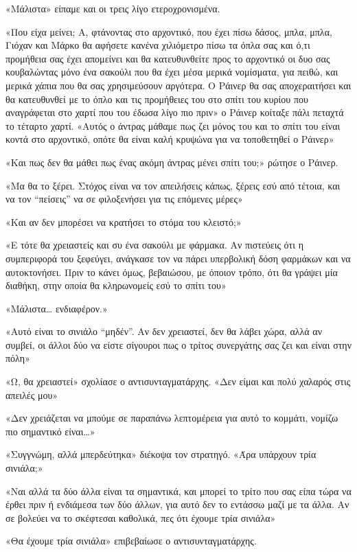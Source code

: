 \documentclass[12pt,twoside, openany]{book}
\begin{document}
«Μάλιστα» είπαμε και οι τρεις λίγο ετεροχρονισμένα.

«Που είχα μείνει; Α, φτάνοντας στο αρχοντικό, που έχει πίσω δάσος, μπλα, μπλα, Γιόχαν και Μάρκο θα αφήσετε κανένα χιλιόμετρο πίσω τα όπλα σας και ό,τι προμήθεια σας έχει απομείνει και θα κατευθυνθείτε προς το αρχοντικό οι δυο σας κουβαλώντας μόνο ένα σακούλι που θα έχει μέσα μερικά νομίσματα, για πειθώ, και μερικά χάπια που θα σας χρησιμεύσουν αργότερα. Ο Ράινερ θα σας αποχεραιτήσει και θα κατευθυνθεί με το όπλο και τις προμήθειες του στο σπίτι του κυρίου που αναγράφεται στο χαρτί που του έδωσα λίγο πιο πριν» ο Ράινερ κοίταξε πάλι πεταχτά το τέταρτο χαρτί. «Αυτός ο άντρας μάθαμε πως ζει μόνος του και το σπίτι του είναι κοντά στο αρχοντικό, οπότε θα είναι καλή κρυψώνα για να τοποθετηθεί ο Ράινερ»

«Και πως δεν θα μάθει πως ένας ακόμη άντρας μένει σπίτι του;» ρώτησε ο Ράινερ.

«Μα θα το ξέρει. Στόχος είναι να τον απειλήσεις κάπως, ξέρεις εσύ από τέτοια, και να τον “πείσεις” να σε φιλοξενήσει για τις επόμενες μέρες»

«Και αν δεν μπορέσει να κρατήσει το στόμα του κλειστό;»

«Ε τότε θα χρειαστείς και συ ένα σακούλι με φάρμακα. Αν πιστεύεις ότι η συμπεριφορά του ξεφεύγει, ανάγκασε τον να πάρει υπερβολική δόση φαρμάκων και να αυτοκτονήσει. Πριν το κάνει όμως, βεβαιώσου, με όποιον τρόπο, ότι θα γράψει μία διαθήκη, στην οποία θα κληρωνομείς εσύ το σπίτι του»

«Μάλιστα… ενδιαφέρον.»

«Αυτό είναι το σινιάλο “μηδέν”. Αν δεν χρειαστεί, δεν θα λάβει χώρα, αλλά αν συμβεί, οι άλλοι δύο να είστε σίγουροι πως ο τρίτος συνεργάτης σας ζει και είναι στην πόλη»

«Ω, θα χρειαστεί» σχολίασε ο αντισυνταγματάρχης. «Δεν είμαι και πολύ χαλαρός στις απειλές μου»

«Δεν χρειάζεται να μπούμε σε παραπάνω λεπτομέρεια για αυτό το κομμάτι, νομίζω πιο σημαντικό είναι…»

«Συγγνώμη, αλλά μπερδεύτηκα» διέκοψα τον στρατηγό. «Άρα υπάρχουν τρία σινιάλα;»

«Ναι αλλά τα δύο άλλα είναι τα σημαντικά, και μπορεί το τρίτο που σας είπα τώρα να έρθει πριν ή ενδιάμεσα των δύο άλλων, για αυτό δεν το εντάσσω μαζί με τα άλλα. Αν σε βολεύει να το σκέφτεσαι καθολικά, πες ότι έχουμε τρία σινιάλα»

«Θα έχουμε τρία σινιάλα» επιβεβαίωσε ο αντισυνταγματάρχης.
\end{document}
